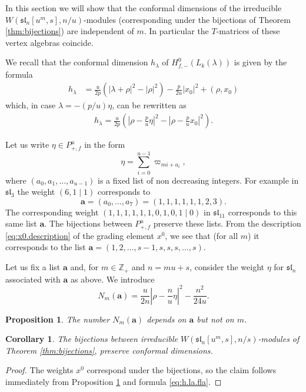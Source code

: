 \documentclass[12pt]{amsart}
\theoremstyle{plain}
\newtheorem{prop}[thm]{Proposition}
\newtheorem{cor}[thm]{Corollary}
\theoremstyle{definition}
\numberwithin{equation}{section}
\newcommand{\la}{\lambda}
\newcommand{\Z}{\mathbb{Z}}
\newcommand{\sll}{\mathfrak{sl}}
\begin{document}
In this section we will show that the conformal dimensions of the irreducible $W(\sll_n[u^m, s], n/u)$-modules (corresponding under the bijections of Theorem \ref{thm:bijections}) are independent of $m$. In particular the $T$-matrices of these vertex algebras coincide.

We recall that the conformal dimension $h_\la$ of $H_{f, -}^0(L_k(\la))$ is given by the formula {\cite[Remark 2.2]{KRW03}}
\begin{align*}
h_\la &= \frac{u}{2p}\left(|\la+\rho|^2 - |\rho|^2\right) - \frac{p}{2u}|x_0|^2 + (\rho, x_0)
\end{align*}
which, in case $\la = -(p/u)\eta$, can be rewritten as
\begin{align}\label{eq:h.la.fla}
h_\la = \frac{u}{2p}\left(|\rho-\frac{p}{u}\eta|^2 - |\rho-\frac{p}{u}x_0|^2\right). 
\end{align}

Let us write $\eta \in P_{+, f}^u$ in the form
\[
\eta = \sum_{i=0}^{u-1} \varpi_{mi + a_i},
\]
where $(a_0, a_1, \ldots, a_{u-1})$ is a fixed list of non decreasing integers. For example in $\sll_3$ the weight $(6, 1 \mid 1)$ corresponds to
\[
\mathbf{a} = (a_0, \ldots, a_7) = (1, 1, 1, 1, 1, 1, 2, 3).
\]
The corresponding weight $(1, 1, 1, 1, 1, 1, 0, 1, 0, 1 \mid 0)$ in $\sll_{11}$ corresponds to this same list $\mathbf{a}$. The bijections between $P_{+, f}^u$ preserve these lists. From the description \eqref{eq:x0.description} of the grading element $x^0$, we see that (for all $m$) it corresponds to the list $\mathbf{a} = (1, 2, \ldots, s-1, s, s, s, \ldots, s)$.

Let us fix a list $\mathbf{a}$ and, for $m \in \Z_{+}$ and $n = mu+s$, consider the weight $\eta$ for $\sll_n$ associated with $\mathbf{a}$ as above. We introduce
\[
N_m(\mathbf{a}) = \frac{u}{2n} \left|\rho - \frac{n}{u}\eta\right|^2 - \frac{n^2}{24u}.
\]
\begin{prop}\label{prop:N.const}
The number $N_m(\mathbf{a})$ depends on $\mathbf{a}$ but not on $m$.
\end{prop}

\begin{cor}\label{cor:same.confdim}
The bijections between irreducible $W(\sll_n[u^m, s], n/s)$-modules of Theorem \ref{thm:bijections}, preserve conformal dimensions.
\end{cor}

\begin{proof}
The weights $x^0$ correspond under the bijections, so the claim follows immediately from Proposition \ref{prop:N.const} and formula \eqref{eq:h.la.fla}.
\end{proof}
\end{document}
